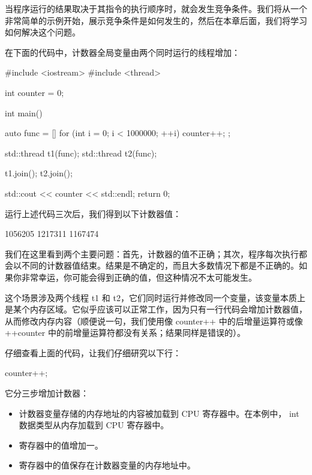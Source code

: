 当程序运行的结果取决于其指令的执行顺序时，就会发生竞争条件。我们将从一个非常简单的示例开始，展示竞争条件是如何发生的，然后在本章后面，我们将学习如何解决这个问题。

在下面的代码中，计数器全局变量由两个同时运行的线程增加：

\begin{cpp}
#include <iostream>
#include <thread>

int counter = 0;

int main() {
    auto func = [] {
        for (int i = 0; i < 1000000; ++i) {
            counter++;
        }
    };

    std::thread t1(func);
    std::thread t2(func);

    t1.join();
    t2.join();

    std::cout << counter << std::endl;
    return 0;
}
\end{cpp}

运行上述代码三次后，我们得到以下计数器值：

\begin{shell}
1056205
1217311
1167474
\end{shell}

我们在这里看到两个主要问题：首先，计数器的值不正确；其次，程序每次执行都会以不同的计数器值结束。结果是不确定的，而且大多数情况下都是不正确的。如果你非常幸运，你可能会得到正确的值，但这种情况不太可能发生。

这个场景涉及两个线程 t1 和 t2，它们同时运行并修改同一个变量，该变量本质上是某个内存区域。它似乎应该可以正常工作，因为只有一行代码会增加计数器值，从而修改内存内容（顺便说一句，我们使用像 counter++ 中的后增量运算符或像 ++counter 中的前增量运算符都没有关系；结果同样是错误的）。

仔细查看上面的代码，让我们仔细研究以下行：

\begin{cpp}
counter++;
\end{cpp}

它分三步增加计数器：

\begin{itemize}
\item
计数器变量存储的内存地址的内容被加载到 CPU 寄存器中。在本例中， int 数据类型从内存加载到 CPU 寄存器中。

\item
寄存器中的值增加一。

\item
寄存器中的值保存在计数器变量的内存地址中。
\end{itemize}

